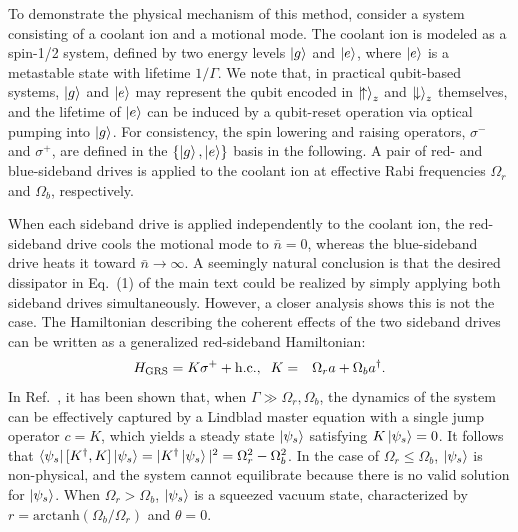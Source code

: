 \documentclass[%
reprint,
superscriptaddress,
amsmath,amssymb,
aps,
prl,
floatfix,
]{revtex4-2}
\begin{document}
To demonstrate the physical mechanism of this method, consider a system consisting of a coolant ion and a motional mode. The coolant ion is modeled as a spin-1/2 system, defined by two energy levels $\ket{g}$ and $\ket{e}$, where $\ket{e}$ is a metastable state with lifetime $1/\Gamma$. We note that, in practical qubit-based systems, $\ket{g}$ and $\ket{e}$ may represent the qubit encoded in $\ket{\!\uparrow}_z$ and $\ket{\!\downarrow}_z$ themselves, and the lifetime of $\ket{e}$ can be induced by a qubit-reset operation via optical pumping into $\ket{g}$. For consistency, the spin lowering and raising operators, $\sigma^-$ and $\sigma^+$, are defined in the $\{\ket{g},\ket{e}\}$ basis in the following. A pair of red- and blue-sideband drives is applied to the coolant ion at effective Rabi frequencies $\Omega_r$ and $\Omega_b$, respectively.

When each sideband drive is applied independently to the coolant ion, the red-sideband drive cools the motional mode to $\bar{n}=0$, whereas the blue-sideband drive heats it toward $\bar{n}\to\infty$. A seemingly natural conclusion is that the desired dissipator in Eq.~(1) %
of the main text \cite{so2025fT} could be realized by simply applying both sideband drives simultaneously. However, a closer analysis shows this is not the case. The Hamiltonian describing the coherent effects of the two sideband drives can be written as a generalized red-sideband Hamiltonian:
\begin{eqnarray}
    H_{\rm GRS}= K\sigma^++{\rm h.c.},\;\;K&=&\Omega_ra+\Omega_ba^\dagger.     
\end{eqnarray}
In Ref.~\cite{kienzler2015thesis}, it has been shown that, when $\Gamma\gg\Omega_r,\Omega_b$, the dynamics of the system can be effectively captured by a Lindblad master equation with a single jump operator $c=K$, which yields a steady state $\ket{\psi_s}$ satisfying $K\ket{\psi_s}=0$. It follows that $\bra{\psi_s}[K^\dagger,K]\ket{\psi_s}=|K^\dagger \ket{\psi_s}|^2=\Omega_r^2-\Omega_b^2$. In the case of $\Omega_r\leq\Omega_b$, $\ket{\psi_s}$ is non-physical, and the system cannot equilibrate because there is no valid solution for $\ket{\psi_s}$. When $\Omega_r>\Omega_b $, $\ket{\psi_s}$ is a squeezed vacuum state, characterized by $r=\text{arctanh}(\Omega_b/\Omega_r)$ and $\theta=0$.
\end{document}
